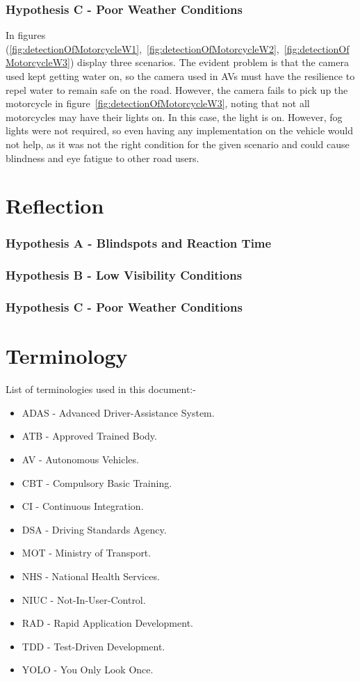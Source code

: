 \documentclass[12pt]{report} %
\begin{document}
	\subsection*{Hypothesis C - Poor Weather Conditions}
		In figures (\ref{fig:detectionOfMotorcycleW1},~\ref{fig:detectionOfMotorcycleW2},~\ref{fig:detectionOfMotorcycleW3}) display three scenarios. The evident problem is that the camera used kept getting water on, so the camera used in AVs must have the resilience to repel water to remain safe on the road. However, the camera fails to pick up the motorcycle in figure~\ref{fig:detectionOfMotorcycleW3}, noting that not all motorcycles may have their lights on. In this case, the light is on. However, fog lights were not required, so even having any implementation on the vehicle would not help, as it was not the right condition for the given scenario and could cause blindness and eye fatigue to other road users.

\chapter{Reflection}
	\subsection*{Hypothesis A - Blindspots and Reaction Time}
	\subsection*{Hypothesis B - Low Visibility Conditions}

	\subsection*{Hypothesis C - Poor Weather Conditions}

\chapter*{Terminology}
List of terminologies used in this document:-
\begin{itemize}
	\item ADAS - Advanced Driver-Assistance System.
	\item ATB - Approved Trained Body.
	\item AV - Autonomous Vehicles.
	\item CBT - Compulsory Basic Training.
	\item CI - Continuous Integration.
	\item DSA - Driving Standards Agency.
	\item MOT - Ministry of Transport.
	\item NHS - National Health Services.
	\item NIUC - Not-In-User-Control.
	\item RAD - Rapid Application Development.
	\item TDD - Test-Driven Development.
	\item YOLO - You Only Look Once.
\end{itemize}
  
\end{document}
